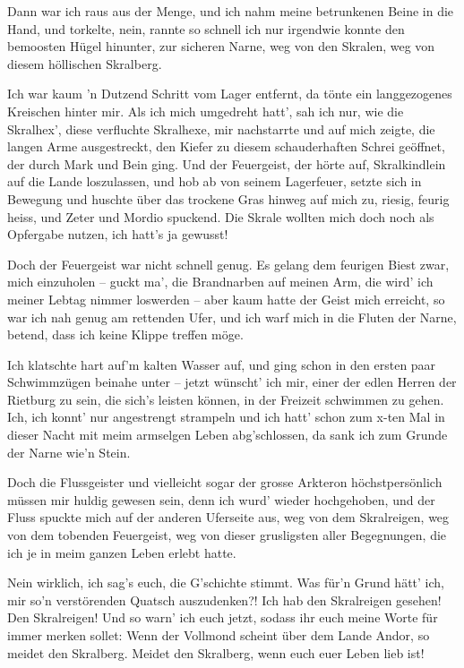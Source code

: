 Dann war ich raus aus der Menge, und ich nahm meine betrunkenen Beine in die Hand, und torkelte, nein, rannte so schnell ich nur irgendwie konnte den bemoosten Hügel hinunter, zur sicheren Narne, weg von den Skralen, weg von diesem höllischen Skralberg.

Ich war kaum ’n Dutzend Schritt vom Lager entfernt, da tönte ein langgezogenes Kreischen hinter mir. Als ich mich umgedreht hatt’, sah ich nur, wie die Skralhex’, diese verfluchte Skralhexe, mir nachstarrte und auf mich zeigte, die langen Arme ausgestreckt, den Kiefer zu diesem schauderhaften Schrei geöffnet, der durch Mark und Bein ging. Und der Feuergeist, der hörte auf, Skralkindlein auf die Lande loszulassen, und hob ab von seinem Lagerfeuer, setzte sich in Bewegung und huschte über das trockene Gras hinweg auf mich zu, riesig, feurig heiss, und Zeter und Mordio spuckend. Die Skrale wollten mich doch noch als Opfergabe nutzen, ich hatt’s ja gewusst!

Doch der Feuergeist war nicht schnell genug. Es gelang dem feurigen Biest zwar, mich einzuholen – guckt ma’, die Brandnarben auf meinen Arm, die wird’ ich meiner Lebtag nimmer loswerden – aber kaum hatte der Geist mich erreicht, so war ich nah genug am rettenden Ufer, und ich warf mich in die Fluten der Narne, betend, dass ich keine Klippe treffen möge.

Ich klatschte hart auf’m kalten Wasser auf, und ging schon in den ersten paar Schwimmzügen beinahe unter – jetzt wünscht’ ich mir, einer der edlen Herren der Rietburg zu sein, die sich’s leisten können, in der Freizeit schwimmen zu gehen. Ich, ich konnt’ nur angestrengt strampeln und ich hatt’ schon zum x-ten Mal in dieser Nacht mit meim armselgen Leben abg’schlossen, da sank ich zum Grunde der Narne wie’n Stein.

Doch die Flussgeister und vielleicht sogar der grosse Arkteron höchstpersönlich müssen mir huldig gewesen sein, denn ich wurd’ wieder hochgehoben, und der Fluss spuckte mich auf der anderen Uferseite aus, weg von dem Skralreigen, weg von dem tobenden Feuergeist, weg von dieser grusligsten aller Begegnungen, die ich je in meim ganzen Leben erlebt hatte.

Nein wirklich, ich sag’s euch, die G’schichte stimmt. Was für’n Grund hätt’ ich, mir so’n verstörenden Quatsch auszudenken?! Ich hab den Skralreigen gesehen! Den Skralreigen! Und so warn’ ich euch jetzt, sodass ihr euch meine Worte für immer merken sollet: Wenn der Vollmond scheint über dem Lande Andor, so meidet den Skralberg. Meidet den Skralberg, wenn euch euer Leben lieb ist!






